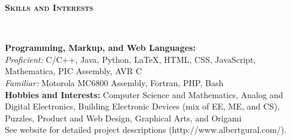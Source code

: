 \documentclass{article}
\newenvironment{changemargin}[2]{%
  \begin{list}{}{%
    \setlength{\topsep}{0pt}%
    \setlength{\leftmargin}{#1}%
    \setlength{\rightmargin}{#2}%
    \setlength{\listparindent}{\parindent}%
    \setlength{\itemindent}{\parindent}%
    \setlength{\parsep}{\parskip}%
  }%
  \item[]}{\end{list}
}
\newcommand{\lineover}{
	\begin{changemargin}{-0.05in}{-0.05in}
		\vspace*{-8pt}
		\hrulefill \\
		\vspace*{-2pt}
	\end{changemargin}
}
\newcommand{\header}[1]{
	\begin{changemargin}{-0.5in}{-0.5in}
		{\large \textbf{\scshape{#1}}}\\
  	\lineover
	\end{changemargin}
}
\newenvironment{body} {
	\vspace*{-16pt}
	\begin{changemargin}{-0.25in}{-0.5in}
  }	
	{\end{changemargin}
}
\begin{document}
\smallskip


\header{Skills and Interests}

\begin{body}
	\vspace{14pt}
	\textbf{Programming, Markup, and Web Languages:} \\
	\textit{Proficient:} C/C++, Java, Python, \LaTeX, HTML, CSS, JavaScript, Mathematica, PIC Assembly, AVR C \\ 
	\textit{Familiar:} Motorola MC6800 Assembly, Fortran, PHP, Bash \\
	\medskip
	\textbf{Hobbies and Interests:} Computer Science and Mathematics, Analog and Digital Electronics, Building Electronic Devices (mix of EE, ME, and CS), Puzzles, Product and Web Design, Graphical Arts, and Origami \\ See website for detailed project descriptions (http://www.albertgural.com/). \\
\end{body}

\smallskip
\end{document}
